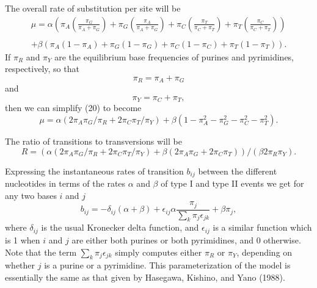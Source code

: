 \documentclass[12pt]{article}
\begin{document}
The overall rate of substitution per site will be
\begin{equation}%
\begin{array}{c}
\mu = \alpha \left(\pi_A \left(\frac{\pi_G}{\pi_A+\pi_G}\right) + \pi_G \left(\frac{\pi_A}{\pi_A+\pi_G}\right) + \pi_C \left(\frac{\pi_T}{\pi_C+\pi_T}\right)
+\pi_T \left(\frac{\pi_C}{\pi_C+\pi_T}\right)\right)\\
\\
 + \beta (\pi_A (1-\pi_A) + \pi_G (1-\pi_G) +
\pi_C (1-\pi_C) + \pi_T (1-\pi_T)).
\end{array}
\end{equation}
If $\pi_R$ and $\pi_Y$ are the equilibrium base frequencies of purines and
pyrimidines, respectively, so that
\begin{equation}%
\pi_R = \pi_A + \pi_G
\end{equation}
and
\begin{equation}%
\pi_Y = \pi_C + \pi_T,
\end{equation}
then we can simplify (20) to become
\begin{equation}%
\mu = \alpha \left(2\pi_A\pi_G/\pi_R+2\pi_C\pi_T/\pi_Y\right)+\beta \left(1-\pi_A^2-\pi_G^2-\pi_C^2-\pi_T^2\right).
\end{equation}

The ratio of transitions to transversions will be
\begin{equation}%
R = \left(\alpha \left(2\pi_A\pi_G/\pi_R+2\pi_C\pi_T/\pi_Y\right)+\beta \left(2\pi_A\pi_G+2\pi_C\pi_T\right)\right)/\left(\beta 2\pi_R\pi_Y\right).
\end{equation}

Expressing the instantaneous rates of transition $b_{ij}$ between the different nucleotides in terms
of the rates $\alpha$ and $\beta$ of type I and type II events we get for any
two bases $i$ and $j$
\begin{equation}%
b_{ij} = -\delta_{ij} (\alpha+\beta) + \epsilon_{ij} \alpha \frac{\pi_j}{\sum_k \pi_j \epsilon_{jk}} + \beta \pi_j,
\end{equation}
where $\delta_{ij}$ is the usual Kronecker delta function, and $\epsilon_{ij}$
is a similar function which is 1 when $i$ and $j$ are either both purines
or both pyrimidines, and 0 otherwise.  Note that the term $\sum_k \pi_j \epsilon_{jk}$ simply computes either $\pi_R$ or $\pi_Y$, depending on whether $j$ is a
purine or a pyrimidine.  This parameterization of the model is
essentially the same as that given by Hasegawa, Kishino, and Yano (1988).
\end{document}
